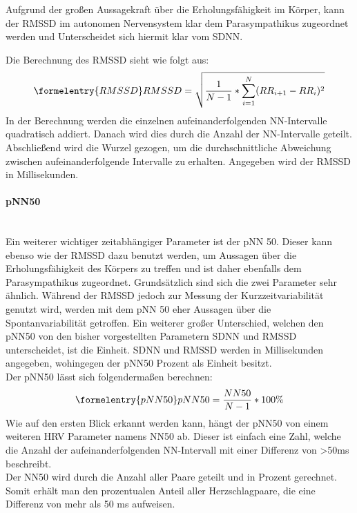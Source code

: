 Aufgrund der großen Aussagekraft über die Erholungsfähigkeit im Körper, kann der RMSSD im autonomen Nervensystem klar dem Parasympathikus zugeordnet werden und Unterscheidet sich hiermit klar vom SDNN. 

Die Berechnung des RMSSD sieht wie folgt aus:
\begin{equation}\formelentry{RMSSD}
	RMSSD = \sqrt{\dfrac{1}{N-1} * \sum\limits_{i=1}^{N}  (RR_{i+1} - RR_i)^{2}}
\end{equation}
In der Berechnung werden die einzelnen aufeinanderfolgenden NN-Intervalle quadratisch addiert. Danach wird dies durch die Anzahl der NN-Intervalle geteilt. Abschließend wird die Wurzel gezogen, um die durchschnittliche Abweichung zwischen aufeinanderfolgende Intervalle zu erhalten. Angegeben wird der RMSSD in Millisekunden.\cite{rmssdart}\cite{zeit} \\


\paragraph{pNN50}\mbox{} \\
Ein weiterer wichtiger zeitabhängiger Parameter ist der pNN 50. Dieser kann ebenso wie der RMSSD dazu benutzt werden, um Aussagen über die Erholungsfähigkeit des Körpers zu treffen und ist daher ebenfalls dem Parasympathikus zugeordnet. Grundsätzlich sind sich die zwei Parameter sehr ähnlich.
Während der RMSSD jedoch zur Messung der Kurzzeitvariabilität genutzt wird, werden mit dem pNN 50 eher Aussagen über die Spontanvariabilität getroffen. \cite[S.2]{babilon}
Ein weiterer großer Unterschied, welchen den pNN50 von den bisher vorgestellten Parametern SDNN und RMSSD unterscheidet, ist die Einheit. SDNN und RMSSD werden in Millisekunden angegeben, wohingegen der pNN50 Prozent als Einheit besitzt. \\

Der pNN50 lässt sich folgendermaßen berechnen:
\begin{equation}\formelentry{pNN50}
	pNN50 =\dfrac{NN50}{N-1} * 100\%
\end{equation}
Wie auf den ersten Blick erkannt werden kann, hängt der pNN50 von einem weiteren HRV Parameter namens NN50 ab. Dieser ist einfach eine Zahl, welche die Anzahl der aufeinanderfolgenden NN-Intervall mit einer Differenz von >50ms beschreibt.\\
Der NN50 wird durch die Anzahl aller Paare geteilt und in Prozent gerechnet. Somit erhält man den prozentualen Anteil aller Herzschlagpaare, die eine Differenz von mehr als 50 ms aufweisen. \cite{zeit}

